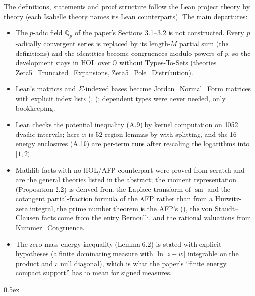 \documentclass[11pt,a4paper]{article}
\begin{document}
The definitions, statements and proof structure follow the Lean project theory by theory (each
Isabelle theory names its Lean counterparts).  The main departures:
\begin{itemize}\sloppy
\item The $p$-adic field $\mathbb{Q}_p$ of the paper's Sections 3.1--3.2 is not constructed.
  Every $p$-adically convergent series is replaced by its length-$M$ partial sum (the 
  definitions) and the identities become congruences modulo powers of $p$, so the development
  stays in HOL over $\mathbb{Q}$ without Types-To-Sets (theories Zeta5\_\allowbreak Truncated\_\allowbreak Expansions,
  Zeta5\_\allowbreak Pole\_\allowbreak Distribution).
\item Lean's  matrices and $\Sigma$-indexed bases become Jordan\_\allowbreak Normal\_\allowbreak Form matrices
  with explicit index lists (, ); dependent types were never
  needed, only bookkeeping.
\item Lean checks the potential inequality (A.9) by kernel computation on 1052 dyadic intervals;
  here it is 52 region lemmas by  with splitting, and the 16 energy enclosures
  (A.10) are per-term  runs after rescaling the logarithms into $[1,2)$.
\item Mathlib facts with no HOL/AFP counterpart were proved from scratch and are the general
  theories listed in the abstract; the moment representation (Proposition 2.2) is derived from
  the Laplace transform of $\sin$ and the cotangent partial-fraction formula of the AFP rather
  than from a Hurwitz-zeta integral, the prime number theorem is the AFP's
  (), the von Staudt--Clausen facts come from the entry Bernoulli, and the rational
  valuations from Kummer\_\allowbreak Congruence.
\item The zero-mass energy inequality (Lemma 6.2) is stated with explicit hypotheses (a finite
  dominating measure with $\ln|z-w|$ integrable on the product and a null diagonal), which is
  what the paper's ``finite energy, compact support'' has to mean for signed measures.
\end{itemize}

\tableofcontents
\newpage
\parindent 0pt\parskip 0.5ex





\end{document}
